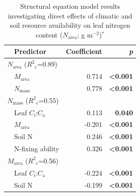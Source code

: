 \newpage
\begin{table}
    \centering
    \caption[Structural equation model results investigating direct effects of climatic and soil resource availability on leaf nitrogen content]{Structural equation model results investigating direct effects of climatic and soil resource availability on leaf nitrogen content ($N_\mathrm{area}$; g m$^{-2}$)$^*$}
        \begin{tabular}{p{0.5cm}p{3cm}p{1.5cm}p{1.5cm}}
            \hline
            & Predictor & \multicolumn{1}{r}{Coefficient} & \multicolumn{1}{r}{\textit{p}} \\
            \hline

            \multicolumn{2}{l}{$N_\mathrm{area}$ ($R^2{}_\mathrm{c}$=0.89)} && \\
            & \multicolumn{1}{l}{$M_\mathrm{area}$} & \multicolumn{1}{r}{0.714}     & \multicolumn{1}{r}{\textbf{<0.001}} \\
            & \multicolumn{1}{l}{$N_\mathrm{mass}$} & \multicolumn{1}{r}{0.778}     & \multicolumn{1}{r}{\textbf{<0.001}} \\
            \hline

            \multicolumn{2}{l}{$N_\mathrm{mass}$ ($R^2{}_\mathrm{c}$=0.55)} && \\
            & \multicolumn{1}{l}{Leaf $C_\mathrm{i}$:$C_\mathrm{a}$}    & \multicolumn{1}{r}{0.113}     & \multicolumn{1}{r}{\textbf{0.040}} \\
            & \multicolumn{1}{l}{$M_\mathrm{area}$}                     & \multicolumn{1}{r}{-0.201}    & \multicolumn{1}{r}{\textbf{<0.001}} \\
            & \multicolumn{1}{l}{Soil N}                                & \multicolumn{1}{r}{0.246}     & \multicolumn{1}{r}{\textbf{<0.001}} \\
            & \multicolumn{1}{l}{N-fixing ability}                      & \multicolumn{1}{r}{0.326}     & \multicolumn{1}{r}{\textbf{<0.001}} \\
            \hline

            \multicolumn{2}{l}{$M_\mathrm{area}$ ($R^2{}_\mathrm{c}$=0.56)} && \\
            & \multicolumn{1}{l}{Leaf $C_\mathrm{i}$:$C_\mathrm{a}$}    & \multicolumn{1}{r}{-0.224}    & \multicolumn{1}{r}{\textbf{<0.001}} \\
            & \multicolumn{1}{l}{Soil N}                                & \multicolumn{1}{r}{-0.199}    & \multicolumn{1}{r}{\textbf{<0.001}} \\
            \hline


\end{tabular}
\end{table}
